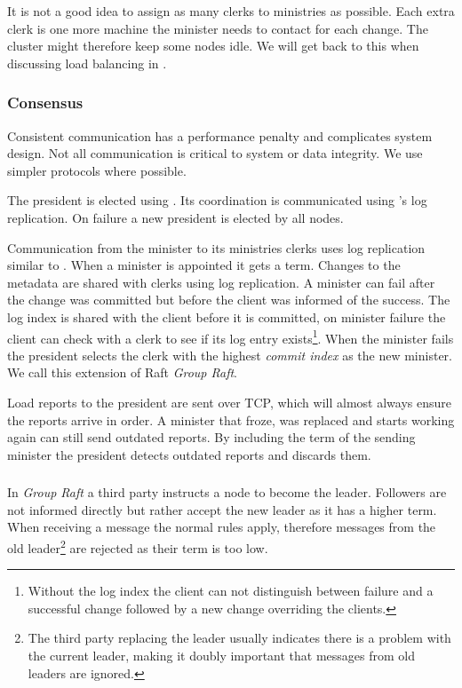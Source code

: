 It is not a good idea to assign as many clerks to ministries as possible. Each extra clerk is one more machine the minister needs to contact for each change. The cluster might therefore keep some nodes idle. We will get back to this when discussing load balancing in .
%
\subsubsection*{Consensus} \label{sec:concensus} \label{sec:praft}
Consistent communication has a performance penalty and complicates system design. Not all communication is critical to system or data integrity. We use simpler protocols where possible. 

The president is elected using \raft{}. Its coordination is communicated using \raft{}'s log replication. On failure a new president is elected by all nodes.

Communication from the minister to its ministries clerks uses log replication similar to \raft{}. When a minister is appointed it gets a \raft{} term. Changes to the metadata are shared with clerks using log replication. A minister can fail after the change was committed but before the client was informed of the success. The log index is shared with the client before it is committed, on minister failure the client can check with a clerk to see if its log entry exists\footnote{Without the log index the client can not distinguish between failure and a successful change followed by a new change overriding the clients.}. When the minister fails the president selects the clerk with the highest \textsl{commit index} as the new minister. We call this extension of Raft \textit{Group Raft}.

Load reports to the president are sent over TCP, which will almost always ensure the reports arrive in order. A minister that froze, was replaced and starts working again can still send outdated reports. By including the term of the sending minister the president detects outdated reports and discards them.
%
\subsubsection*{\graft{}} \label{sec:dictraft}
In \textit{Group Raft} a third party instructs a node to become the leader. Followers are not informed directly but rather accept the new leader as it has a higher term. When receiving a message the normal \raft{} rules apply, therefore messages from the old leader\footnote{The third party replacing the leader usually indicates there is a problem with the current leader, making it doubly important that messages from old leaders are ignored.} are rejected as their term is too low.

